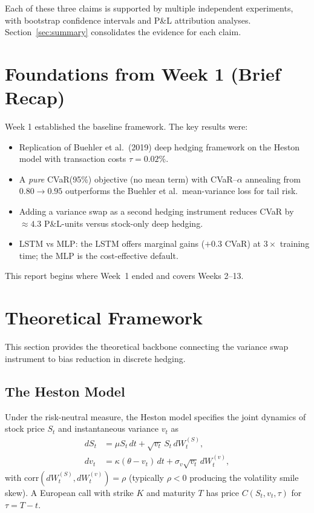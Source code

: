 \documentclass[11pt, a4paper]{article}
\begin{document}
Each of these three claims is supported by multiple independent experiments,
with bootstrap confidence intervals and P\&L attribution analyses.
Section~\ref{sec:summary} consolidates the evidence for each claim.


\section{Foundations from Week 1 (Brief Recap)}
\label{sec:week1-recap}

Week 1 established the baseline framework. The key results were:
\begin{itemize}[leftmargin=*]
  \item Replication of Buehler et al.\ (2019) deep hedging framework on
        the Heston model with transaction costs $\tau = 0.02\%$.
  \item A \emph{pure} CVaR(95\%) objective (no mean term) with
        CVaR--$\alpha$ annealing from $0.80 \rightarrow 0.95$ outperforms
        the Buehler et al.\ mean-variance loss for tail risk.
  \item Adding a variance swap as a second hedging instrument reduces
        CVaR by $\approx 4.3$ P\&L-units versus stock-only deep hedging.
  \item LSTM vs MLP: the LSTM offers marginal gains ($+0.3$ CVaR) at
        $3\times$ training time; the MLP is the cost-effective default.
\end{itemize}
This report begins where Week~1 ended and covers Weeks 2--13.


\section{Theoretical Framework}
\label{sec:theory}

This section provides the theoretical backbone connecting the variance swap
instrument to bias reduction in discrete hedging.

\subsection{The Heston Model}
\label{sec:heston}

Under the risk-neutral measure, the Heston model specifies the joint
dynamics of stock price $S_t$ and instantaneous variance $v_t$ as
\begin{align}
    dS_t &= \mu S_t \, dt + \sqrt{v_t}\, S_t \, dW_t^{(S)}, \\
    dv_t &= \kappa(\theta - v_t)\, dt + \sigma_v \sqrt{v_t}\, dW_t^{(v)},
\end{align}
with $\mathrm{corr}(dW_t^{(S)}, dW_t^{(v)}) = \rho$ (typically $\rho < 0$
producing the volatility smile skew). A European call with strike $K$ and
maturity $T$ has price $C(S_t, v_t, \tau)$ for $\tau = T - t$.
\end{document}
